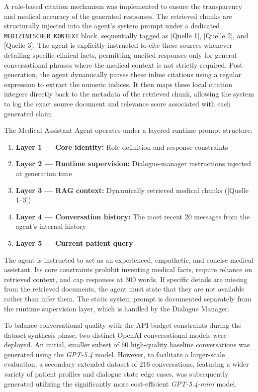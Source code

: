 A rule-based citation mechanism was implemented to ensure the transparency and medical accuracy of the generated responses.
The retrieved chunks are structurally injected into the agent's system prompt under a dedicated \texttt{MEDIZINISCHER KONTEXT} block, sequentially tagged as [Quelle 1], [Quelle 2], and [Quelle 3]. 
The agent is explicitly instructed to cite these sources whenever detailing specific clinical facts, permitting uncited responses only for general conversational phrases where the medical context is not strictly required. 
Post-generation, the agent dynamically parses these inline citations using a regular expression to extract the numeric indices. 
It then maps these local citation integers directly back to the metadata of the retrieved chunk, allowing the system to log the exact source document and relevance score associated with each generated claim.

The Medical Assistant Agent operates under a layered runtime prompt structure:
\begin{enumerate}
    \item \textbf{Layer 1 — Core identity:} Role definition and response constraints
    \item \textbf{Layer 2 — Runtime supervision:} Dialogue-manager instructions injected at generation time
    \item \textbf{Layer 3 — RAG context:} Dynamically retrieved medical chunks ([Quelle 1--3])
    \item \textbf{Layer 4 — Conversation history:} The most recent 20 messages from the agent's internal history
    \item \textbf{Layer 5 — Current patient query}
\end{enumerate}

The agent is instructed to act as an experienced, empathetic, and concise medical assistant. Its core constraints prohibit inventing medical facts, require reliance on retrieved context, and cap responses at $300$ words. If specific details are missing from the retrieved documents, the agent must state that they are not available rather than infer them. The static system prompt is documented separately from the runtime supervision layer, which is handled by the Dialogue Manager.

To balance conversational quality with the API budget constraints during the dataset synthesis phase, two distinct OpenAI conversational models were deployed. 
An initial, smaller subset of $60$ high-quality baseline conversations was generated using the \textit{GPT-5.4} model. 
However, to facilitate a larger-scale evaluation, a secondary extended dataset of $216$ conversations, featuring a wider variety of patient profiles and dialogue state edge cases, was subsequently generated utilizing the significantly more cost-efficient \textit{GPT-5.4-mini} model.

